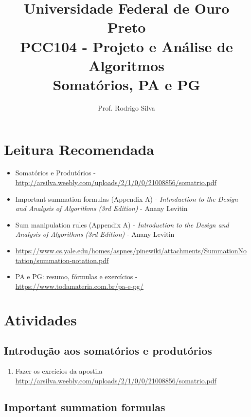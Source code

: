 \documentclass{article}
\title{\vspace{-2 cm}Universidade Federal de Ouro Preto \\ PCC104 - Projeto e Análise de Algoritmos \\ Somatórios, PA e PG}
\author{Prof. Rodrigo Silva}
\begin{document}
\maketitle

\section*{Leitura Recomendada}

\begin{itemize}
    \item Somatórios e Produtórios - \url{http://arsilva.weebly.com/uploads/2/1/0/0/21008856/somatrio.pdf}
    \item Important summation formulas (Appendix A) - \textit{Introduction to the Design and Analysis of Algorithms (3rd Edition)} - Anany Levitin 
    \item Sum manipulation rules (Appendix A) - \textit{Introduction to the Design and Analysis of Algorithms (3rd Edition)} - Anany Levitin 
    \item \url{https://www.cs.yale.edu/homes/aspnes/pinewiki/attachments/SummationNotation/summation-notation.pdf}
    \item PA e PG: resumo, fórmulas e exercícios - \url{https://www.todamateria.com.br/pa-e-pg/}
\end{itemize}


\section{Atividades}

\subsection{Introdução aos somatórios e produtórios}

\begin{enumerate}
    \item Fazer os exrcícios da apostila \url{http://arsilva.weebly.com/uploads/2/1/0/0/21008856/somatrio.pdf}
\end{enumerate}

\subsection{Important summation formulas}
\end{document}
